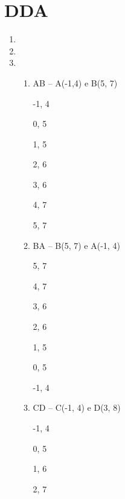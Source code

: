 \section*{DDA}

	\begin{enumerate}\addtocounter{enumi}{7}
		\item 
		
		\item 

		\item 
		
		\begin{enumerate}[label=\alph*.]
				   \setlength\itemsep{1em}
					\item	 AB – A(-1,4) e B(5, 7)
					   				
                         -1, 4
                         
                          0, 5
                          
                           1, 5
                           
                           2, 6
                           
                           3, 6
                           
                           4, 7
                           
                            5, 7
					
					\item    BA – B(5, 7) e A(-1, 4)
					
                           5, 7
                           
                          4, 7
                          
                          3, 6
                          
                          2, 6
                          
                          1, 5
                          
                         0, 5
                         
                         -1, 4
									
					\item  CD – C(-1, 4) e D(3, 8)
					
						 -1, 4
						 
						 0, 5
						  
						 1, 6
						  
						 2, 7
						  

\end{enumerate}
\end{enumerate}
